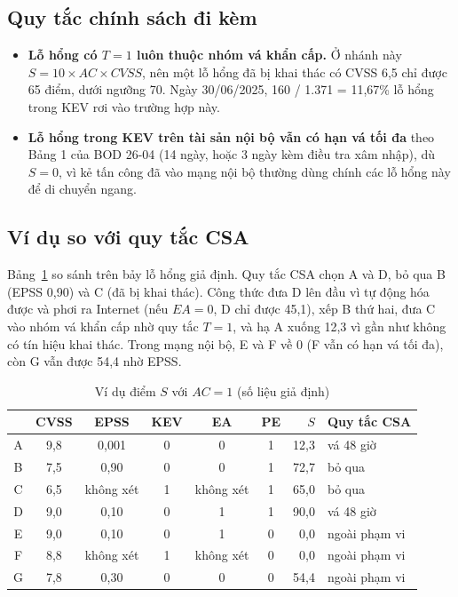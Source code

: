 \documentclass[conference]{IEEEtran}
\begin{document}
\subsection{Quy tắc chính sách đi kèm}
\begin{itemize}
\item \textbf{Lỗ hổng có $T = 1$ luôn thuộc nhóm vá khẩn cấp.} Ở nhánh này $S = 10 \times AC \times \mathit{CVSS}$,
nên một lỗ hổng đã bị khai thác có CVSS 6,5 chỉ được 65 điểm, dưới ngưỡng 70. Ngày 30/06/2025, 160 / 1.371 = 11,67\%
lỗ hổng trong KEV rơi vào trường hợp này.
\item \textbf{Lỗ hổng trong KEV trên tài sản nội bộ vẫn có hạn vá tối đa} theo Bảng 1 của BOD 26-04 (14 ngày, hoặc
3 ngày kèm điều tra xâm nhập), dù $S = 0$, vì kẻ tấn công đã vào mạng nội bộ thường dùng chính các lỗ hổng này để
di chuyển ngang.
\end{itemize}

\subsection{Ví dụ so với quy tắc CSA}
Bảng~\ref{tab:vidu} so sánh trên bảy lỗ hổng giả định. Quy tắc CSA chọn A và D, bỏ qua B (EPSS 0,90) và C (đã bị
khai thác). Công thức đưa D lên đầu vì tự động hóa được và phơi ra Internet (nếu $\mathit{EA} = 0$, D chỉ được 45,1),
xếp B thứ hai, đưa C vào nhóm vá khẩn cấp nhờ quy tắc $T = 1$, và hạ A xuống 12,3 vì gần như không có tín hiệu khai
thác. Trong mạng nội bộ, E và F về 0 (F vẫn có hạn vá tối đa), còn G vẫn được 54,4 nhờ EPSS.

\begin{table}[t]
\centering
\caption{Ví dụ điểm $S$ với $AC = 1$ (số liệu giả định)}\label{tab:vidu}
\footnotesize
\setlength{\tabcolsep}{3pt}
\begin{tabular}{ccccccrl}
\toprule
 & CVSS & EPSS & KEV & EA & PE & $S$ & Quy tắc CSA \\
\midrule
A & 9,8 & 0,001 & 0 & 0 & 1 & 12,3 & vá 48 giờ \\
B & 7,5 & 0,90 & 0 & 0 & 1 & 72,7 & bỏ qua \\
C & 6,5 & không xét & 1 & không xét & 1 & 65,0 & bỏ qua \\
D & 9,0 & 0,10 & 0 & 1 & 1 & 90,0 & vá 48 giờ \\
E & 9,0 & 0,10 & 0 & 1 & 0 & 0,0 & ngoài phạm vi \\
F & 8,8 & không xét & 1 & không xét & 0 & 0,0 & ngoài phạm vi \\
G & 7,8 & 0,30 & 0 & 0 & 0 & 54,4 & ngoài phạm vi \\
\bottomrule
\end{tabular}
\end{table}
\end{document}
